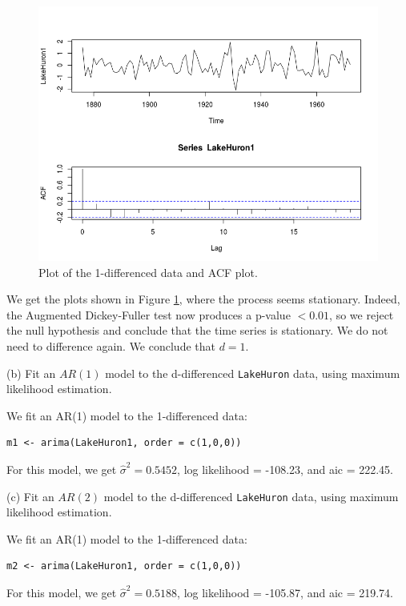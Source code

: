 \documentclass[]{article}
\begin{document}
\begin{figure}[!ht]
\centering
\includegraphics[width=.8\textwidth]{huron1plot.png}
\caption{Plot of the 1-differenced data and ACF plot.}
\label{huron1plot}
\end{figure}


We get the plots shown in Figure \ref{huron1plot}, where the process seems stationary. Indeed, the Augmented Dickey-Fuller test now produces a p-value $< 0.01$, so we reject the null hypothesis and conclude that the time series is stationary. We do not need to difference again. We conclude that $d=1$.

\color{black}

(b) Fit an $AR(1)$ model to the d-differenced \texttt{LakeHuron} data, using maximum likelihood estimation.

\color{blue}
We fit an AR(1) model to the 1-differenced data:

\begin{Verbatim}[frame=single]
m1 <- arima(LakeHuron1, order = c(1,0,0))
\end{Verbatim}

For this model, we get $\hat{\sigma}^2 = 0.5452$, log likelihood = -108.23, and aic = 222.45.
\color{black}

(c) Fit an $AR(2)$ model to the d-differenced \texttt{LakeHuron} data, using maximum likelihood estimation.

\color{blue}
We fit an AR(1) model to the 1-differenced data:

\begin{Verbatim}[frame=single]
m2 <- arima(LakeHuron1, order = c(1,0,0))
\end{Verbatim}

For this model, we get $\hat{\sigma}^2 = 0.5188$, log likelihood = -105.87, and aic = 219.74.
\color{black}
\end{document}
